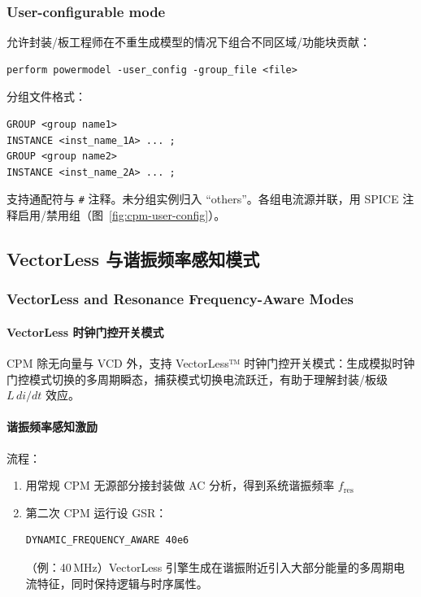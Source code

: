 \subsubsection*{User-configurable mode}

允许封装/板工程师在不重生成模型的情况下组合不同区域/功能块贡献：
\begin{lstlisting}
perform powermodel -user_config -group_file <file>
\end{lstlisting}

分组文件格式：
\begin{lstlisting}
GROUP <group name1>
INSTANCE <inst_name_1A> ... ;
GROUP <group name2>
INSTANCE <inst_name_2A> ... ;
\end{lstlisting}
支持通配符与 \texttt{\#} 注释。未分组实例归入 ``others''。各组电流源并联，用 SPICE 注释启用/禁用组（图~\ref{fig:cpm-user-config}）。



\subsection{VectorLess 与谐振频率感知模式}
\subsubsection*{VectorLess and Resonance Frequency-Aware Modes}

\paragraph{VectorLess 时钟门控开关模式}
CPM 除无向量与 VCD 外，支持 VectorLess™ 时钟门控开关模式：生成模拟时钟门控模式切换的多周期瞬态，捕获模式切换电流跃迁，有助于理解封装/板级 $L\,di/dt$ 效应。

\paragraph{谐振频率感知激励}
流程：
\begin{enumerate}
  \item 用常规 CPM 无源部分接封装做 AC 分析，得到系统谐振频率 $f_{\mathrm{res}}$
  \item 第二次 CPM 运行设 GSR：
\begin{lstlisting}
DYNAMIC_FREQUENCY_AWARE 40e6
\end{lstlisting}
  （例：40\,MHz）VectorLess 引擎生成在谐振附近引入大部分能量的多周期电流特征，同时保持逻辑与时序属性。
\end{enumerate}


